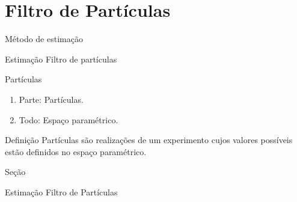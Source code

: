 \documentclass{beamer}
\begin{document}
\section{Filtro de Partículas}

\begin{frame}{Método de estimação}
    \begin{block}{Estimação}
      \Huge  Filtro de partículas
    \end{block}

\end{frame}



\begin{frame}{Partículas}
\noindent


    \begin{enumerate}
      \item<2-| alert@2> Parte: Partículas.
      \item<3-| alert@3> Todo: Espaço paramétrico.
    \end{enumerate}
    
\pause
\pause
\pause
  \begin{block}{Definição}
  {\large Partículas são realizações de um experimento cujos valores possíveis estão definidos no espaço paramétrico.}
\end{block}


 
\end{frame}



\begin{frame}{Seção}
    \begin{block}{Estimação}
      \Huge  Filtro de Partículas
    \end{block}
\end{frame}
\end{document}
